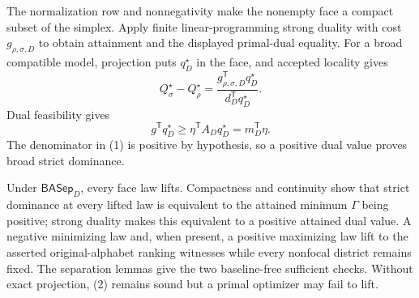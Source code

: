 The normalization row and nonnegativity make the nonempty face a compact subset of the simplex.  Apply finite linear-programming strong duality with cost \(g_{\rho,\sigma,D}\) to obtain attainment and the displayed primal-dual equality.  For a broad compatible model, projection puts \(q_D^\star\) in the face, and accepted locality gives
\[
Q_\sigma^\star-Q_\rho^\star=
\frac{g_{\rho,\sigma,D}^{\mathsf T}q_D^\star}
{d_D^{\mathsf T}q_D^\star}.
\tag{1}
\]
Dual feasibility gives
\[
g^{\mathsf T}q_D^\star\geq
\eta^{\mathsf T}A_Dq_D^\star=m_D^{\mathsf T}\eta.
\tag{2}
\]
The denominator in (1) is positive by hypothesis, so a positive dual value proves broad strict dominance.

Under \(\mathsf{BASep}_D\), every face law lifts.  Compactness and continuity show that strict dominance at every lifted law is equivalent to the attained minimum \(\Gamma\) being positive; strong duality makes this equivalent to a positive attained dual value.  A negative minimizing law and, when present, a positive maximizing law lift to the asserted original-alphabet ranking witnesses while every nonfocal district remains fixed.  The separation lemmas give the two baseline-free sufficient checks.  Without exact projection, (2) remains sound but a primal optimizer may fail to lift.